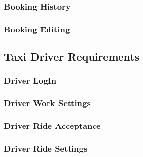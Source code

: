 		\subsubsection{Booking History}
		\subsubsection{Booking Editing}
		
		
	\subsection {Taxi Driver Requirements}
	
		\subsubsection{Driver LogIn}
		\subsubsection{Driver Work Settings}
		\subsubsection{Driver Ride Acceptance}
		\subsubsection{Driver Ride Settings}
